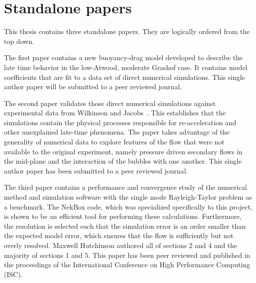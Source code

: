 \chapter{Standalone papers}

This thesis contains three standalone papers.
They are logically ordered from the top down.

The first paper contains a new buoyancy-drag model developed to describe the late time behavior in the low-Atwood, moderate Grashof case.
It contains model coefficients that are fit to a data set of direct numerical simulations.
This single author paper will be submitted to a peer reviewed journal.

The second paper validates those direct numerical simulations against experimental data from Wilkinson and Jacobs~\cite{Wilkinson2007}.
This establishes that the simulations contain the physical processes responsible for re-acceleration and other unexplained late-time phenomena.
The paper takes advantage of the generality of numerical data to explore features of the flow that were not available to the original experiment, namely pressure driven secondary flows in the mid-plane and the interaction of the bubbles with one another.
This single author paper has been submitted to a peer reviewed journal.

The third paper contains a performance and convergence study of the numerical method and simulation software with the single mode Rayleigh-Taylor problem as a benchmark.
The NekBox code, which was specialized specifically to this project, is shown to be an efficient tool for performing these calculations.
Furthermore, the resolution is selected such that the simulation error is an order smaller than the expected model error, which ensures that the flow is sufficiently but not overly resolved.
Maxwell Hutchinson authored all of sections 2 and 4 and the majority of sections 1 and 5.
This paper has been peer reviewed and published in the proceedings of the International Conference on High Performance Computing (ISC).
